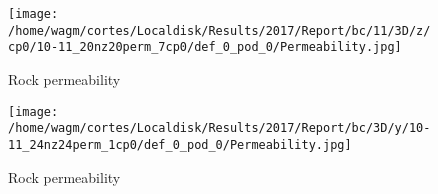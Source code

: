 \documentclass[12pt]{article}
\begin{document}
\begin{figure}[!h] \hspace{-1cm}
\begin{minipage}{.5\textwidth}
 \centering
\texttt{[image: /home/wagm/cortes/Localdisk/Results/2017/Report/bc/11/3D/z/cp0/10-11\_20nz20perm\_7cp0/def\_0\_pod\_0/Permeability.jpg]}
\caption{Rock permeability}
\label{fig:rockperm3d1}
\end{minipage}%
\begin{minipage}{.5\textwidth}
 \centering
\texttt{[image: /home/wagm/cortes/Localdisk/Results/2017/Report/bc/3D/y/10-11\_24nz24perm\_1cp0/def\_0\_pod\_0/Permeability.jpg]}
\caption{Rock permeability}
\label{fig:rockperm3d2}
\end{minipage}%
\end{figure}



% 
\end{document}
